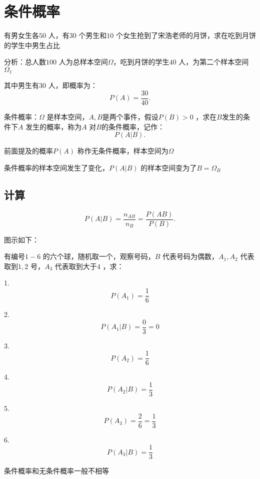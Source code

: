 \section{条件概率}%
\label{sec:条件概率}
\begin{eg}
    有男女生各$50$ 人，有$30$ 个男生和$10$ 个女生抢到了宋浩老师的月饼，求在吃到月饼的学生中男生占比

    分析：总人数$100$ 人为总样本空间$\Omega$，吃到月饼的学生$40$ 人，为第二个样本空间$\Omega_1$

    其中男生有$30$ 人，即概率为：\[
        P\left( A \right) =\frac{30}{40}
    .\] 
\end{eg}
\begin{defi}
    条件概率：$\Omega$ 是样本空间，$A,B$是两个事件，假设$P\left( B \right) >0$ ，求在$B$发生的条件下$A$ 发生的概率，称为$A$ 对$B$的条件概率，记作：
    \[
        P\left( A|B \right) 
    .\] 
\end{defi}
前面提及的概率$P\left( A \right) $ 称作无条件概率，样本空间为$\Omega$ 

条件概率的样本空间发生了变化，$P\left( A|B \right) $ 的样本空间变为了$B=\Omega_B$ 

\subsection{计算}%
\label{sub:计算}
\[
    P\left( A|B \right) =\frac{n_{AB}}{n_B}=\frac{P\left( AB \right) }{P\left( B \right) }
.\] 

图示如下：
\begin{center}
\end{center}
\begin{eg}
    有编号$1-6$ 的六个球，随机取一个，观察号码，$B$ 代表号码为偶数，$A_1,A_2$ 代表取到$1,2$ 号，$A_3$ 代表取到大于$4$ ，求：

    1. $$P\left( A_1 \right) =\frac{1}{6}$$

    2. $$P\left( A_1|B \right) =\frac{0}{3}=0$$

    3. $$P\left( A_2 \right) =\frac{1}{6}$$

    4. $$P\left( A_2|B \right) =\frac{1}{3}$$

    5. $$P\left( A_3 \right) =\frac{2}{6}=\frac{1}{3}$$

    6. $$P\left( A_3|B \right) =\frac{1}{3}$$
\end{eg}
\begin{notation}
    条件概率和无条件概率一般不相等
\end{notation}
